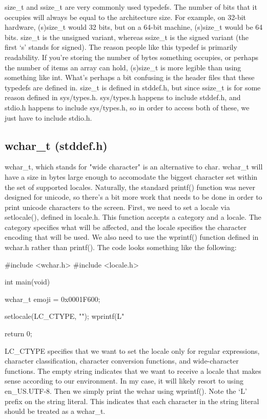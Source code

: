 \documentclass{article}
\begin{document}
size\_t and ssize\_t are very commonly used typedefs. The number of bits that it occupies will always be equal
to the architecture size. For example, on 32-bit hardware, (s)size\_t would 32 bits, but on a 64-bit machine,
(s)size\_t would be 64 bits. size\_t is the unsigned variant, whereas ssize\_t is the signed variant (the first
‘s’ stands for signed). The reason people like this typedef is primarily readability. If you’re storing the
number of bytes something occupies, or perhaps the number of items an array can hold, (s)size\_t is more
legible than using something like int. What’s perhaps a bit confusing is the header files that these typedefs
are defined in. size\_t is defined in stddef.h, but since ssize\_t is for some reason defined in sys/types.h.
sys/types.h happens to include stddef.h, and stdio.h happens to include sys/types.h, so in order to access both
of these, we just have to include stdio.h.

\subsection{wchar\_t (stddef.h)}

wchar\_t, which stands for "wide character" is an alternative to char. wchar\_t will have a size in bytes
large enough to accomodate the biggest character set within the set of supported locales. Naturally, the
standard printf() function was never designed for unicode, so there’s a bit more work that needs to be done
in order to print unicode characters to the screen. First, we need to set a locale via setlocale(), defined in
locale.h. This function accepts a category and a locale. The category specifies what will be affected, and the
locale specifies the character encoding that will be used. We also need to use the wprintf() function defined
in wchar.h rather than printf(). The code looks something like the following:

\begin{cblk}
#include <wchar.h>
#include <locale.h>

int main(void) {
    wchar_t emoji = 0x0001F600;

    setlocale(LC_CTYPE, "");
    wprintf(L"%

    return 0;
}
\end{cblk}

LC\_CTYPE specifies that we want to set the locale only for regular expressions, character classification,
character conversion functions, and wide-character functions. The empty string indicates that we want to
receive a locale that makes sense according to our environment. In my case, it will likely resort to using
en\_US.UTF-8. Then we simply print the wchar using wprintf(). Note the ‘L’ prefix on the string literal. This
indicates that each character in the string literal should be treated as a wchar\_t.
\end{document}
